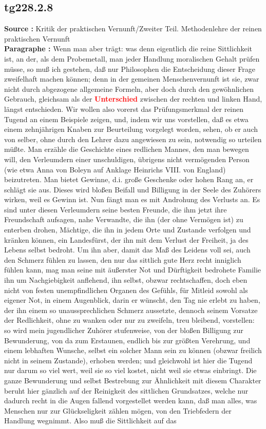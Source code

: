 \documentclass[a4paper,12pt,twoside]{book}
\newcommand{\match}[1]{\textcolor{red}{\textbf{#1}}}
\begin{document}
	\subsection*{tg228.2.8} 
	\textbf{Source : }Kritik der praktischen Vernunft/Zweiter Teil. Methodenlehre der reinen praktischen Vernunft\\  
	
	\noindent\textbf{Paragraphe : }
	Wenn man aber trägt: was denn eigentlich die reine Sittlichkeit ist, an der, als dem Probemetall, man jeder Handlung moralischen Gehalt prüfen müsse, so muß ich gestehen, daß nur Philosophen die Entscheidung dieser Frage zweifelhaft machen können; denn in der gemeinen Menschenvernunft ist sie, zwar nicht durch abgezogene allgemeine Formeln, aber doch durch den gewöhnlichen Gebrauch, gleichsam als der \match{Unterschied} zwischen der rechten und linken Hand, längst entschieden. Wir wollen also vorerst das Prüfungsmerkmal der reinen Tugend an einem Beispiele zeigen, und, indem wir uns vorstellen, daß es etwa einem zehnjährigen Knaben zur Beurteilung vorgelegt worden, sehen, ob er auch von selber, ohne durch den Lehrer dazu angewiesen zu sein, notwendig so urteilen müßte. Man erzähle die Geschichte eines redlichen Mannes, den man bewegen will, den Verleumdern einer unschuldigen, übrigens nicht vermögenden Person (wie etwa Anna von Boleyn auf Anklage Heinrichs VIII. von England) beizutreten. Man bietet Gewinne, d.i. große Geschenke oder hohen Rang an, er schlägt sie aus. Dieses wird bloßen Beifall und Billigung in der Seele des Zuhörers wirken, weil es Gewinn ist. Nun fängt man es mit Androhung des Verlusts an. Es sind unter diesen Verleumdern seine besten Freunde, die ihm jetzt ihre Freundschaft aufsagen, nahe Verwandte, die ihn (der ohne Vermögen ist) zu enterben drohen, Mächtige, die ihn in jedem Orte und Zustande verfolgen und kränken können, ein Landesfürst, der ihn mit dem Verlust der Freiheit, ja des Lebens selbst bedroht. Um ihn aber, damit das Maß des Leidens voll sei, auch den Schmerz fühlen zu lassen, den nur  das sittlich gute Herz recht inniglich fühlen kann, mag man seine mit äußerster Not und Dürftigkeit bedrohete Familie ihn um Nachgiebigkeit anflehend, ihn selbst, obzwar rechtschaffen, doch eben nicht von festen unempfindlichen Organen des Gefühls, für Mitleid sowohl als eigener Not, in einem Augenblick, darin er wünscht, den Tag nie erlebt zu haben, der ihn einem so unaussprechlichen Schmerz aussetzte, dennoch seinem Vorsatze der Redlichkeit, ohne zu wanken oder nur zu zweifeln, treu bleibend, vorstellen: so wird mein jugendlicher Zuhörer stufenweise, von der bloßen Billigung zur Bewunderung, von da zum Erstaunen, endlich bis zur größten Verehrung, und einem lebhaften Wunsche, selbst ein solcher Mann sein zu können (obzwar freilich nicht in seinem Zustande), erhoben werden; und gleichwohl ist hier die Tugend nur darum so viel wert, weil sie so viel kostet, nicht weil sie etwas einbringt. Die ganze Bewunderung und selbst Bestrebung zur Ähnlichkeit mit diesem Charakter beruht hier gänzlich auf der Reinigkeit des sittlichen Grundsatzes, welche nur dadurch recht in die Augen fallend vorgestellet werden kann, daß man alles, was Menschen nur zur Glückseligkeit zählen mögen, von den Triebfedern der Handlung wegnimmt. Also muß die Sittlichkeit auf das 
\end{document}
